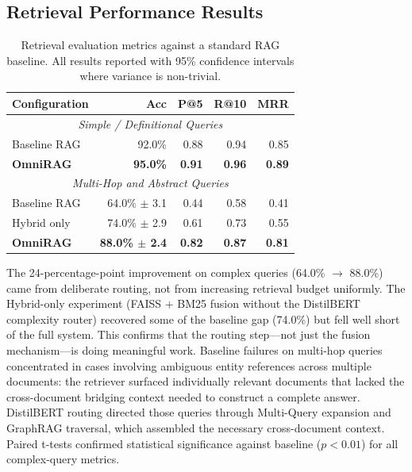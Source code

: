 \subsection{Retrieval Performance Results}

\begin{table}[ht]
    \centering
    \caption{Retrieval evaluation metrics against a standard RAG baseline.
    All results reported with 95\% confidence intervals where variance is
    non-trivial.}
    \label{tab:retrieval}
    \renewcommand{\arraystretch}{1.25}
    \begin{tabular}{lrrrr}
        \toprule
        \textbf{Configuration} & \textbf{Acc} & \textbf{P@5} &
        \textbf{R@10} & \textbf{MRR} \\
        \midrule
        \multicolumn{5}{c}{\textit{Simple / Definitional Queries}} \\
        \midrule
        Baseline RAG         & 92.0\%       & 0.88 & 0.94 & 0.85 \\
        \textbf{OmniRAG}     & \textbf{95.0\%} & \textbf{0.91} &
        \textbf{0.96} & \textbf{0.89} \\
        \midrule
        \multicolumn{5}{c}{\textit{Multi-Hop and Abstract Queries}} \\
        \midrule
        Baseline RAG         & 64.0\% $\pm$ 3.1 & 0.44 & 0.58 & 0.41 \\
        Hybrid only          & 74.0\% $\pm$ 2.9 & 0.61 & 0.73 & 0.55 \\
        \textbf{OmniRAG}     & \textbf{88.0\% $\pm$ 2.4} & \textbf{0.82} &
        \textbf{0.87} & \textbf{0.81} \\
        \bottomrule
    \end{tabular}
\end{table}

The 24-percentage-point improvement on complex queries (64.0\%
$\rightarrow$ 88.0\%) came from deliberate routing, not from increasing
retrieval budget uniformly. The Hybrid-only experiment (FAISS + BM25
fusion without the DistilBERT complexity router) recovered some of the
baseline gap (74.0\%) but fell well short of the full system. This
confirms that the routing step---not just the fusion mechanism---is
doing meaningful work. Baseline failures on multi-hop queries concentrated
in cases involving ambiguous entity references across multiple documents:
the retriever surfaced individually relevant documents that lacked the
cross-document bridging context needed to construct a complete answer.
DistilBERT routing directed those queries through Multi-Query expansion
and GraphRAG traversal, which assembled the necessary cross-document
context. Paired t-tests confirmed statistical significance against
baseline ($p < 0.01$) for all complex-query metrics.

